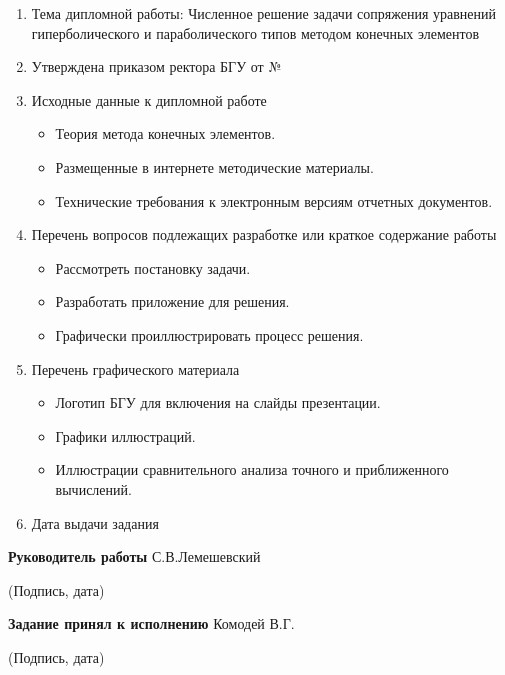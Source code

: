 \begin{enumerate}
	\item Тема дипломной работы: Численное решение задачи сопряжения уравнений гиперболического и параболического типов методом конечных элементов

    \item Утверждена приказом ректора БГУ от \underline{\hspace{4cm}} № \underline{\hspace{1cm}}

	\item Исходные данные к дипломной работе
            \begin{itemize}
			\item Теория метода конечных элементов.
			\item Размещенные в интернете методические материалы.
			\item Технические требования к электронным версиям отчетных документов.
		\end{itemize}

	\item Перечень вопросов подлежащих разработке или краткое содержание работы
		\begin{itemize}
			\item Рассмотреть постановку задачи.
			\item Разработать приложение для решения.
			\item Графически проиллюстрировать процесс решения.
		\end{itemize}

	\item Перечень графического материала
		\begin{itemize}
			\item Логотип БГУ для включения на слайды презентации.
			\item Графики иллюстраций.
			\item Иллюстрации сравнительного анализа точного и приближенного вычислений.
		\end{itemize}

    \item Дата выдачи задания \underline{\hspace{3cm}}
\end{enumerate}
\textbf{Руководитель работы} \underline{\hspace{6cm}}С.В.Лемешевский
\begin{center}
	(Подпись, дата)
\end{center}
\textbf{Задание принял к исполнению}\underline{\hspace{6.5cm}} Комодей В.Г.
\begin{center}
	(Подпись, дата)
\end{center}

\thispagestyle{empty}
